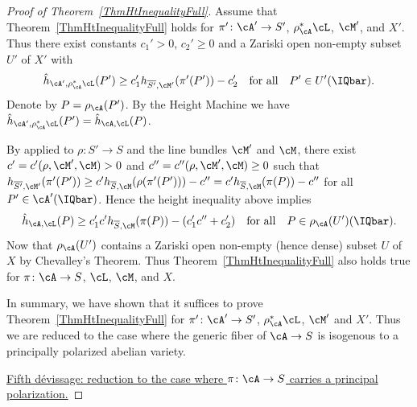 \begin{proof}[Proof of Theorem~\ref{ThmHtInequalityFull}]
Assume that Theorem~\ref{ThmHtInequalityFull} holds for $\pi' \colon \cA' \rightarrow S'$, $\rho_{\cA}^*\cL$, $\cM'$, and $X'$. Thus there exist constants $c_1'>0$, $c_2' \ge 0$ and a Zariski open non-empty subset $U'$ of $X'$ with
\[
\hat{h}_{\cA',\rho_{\cA}^*\cL}(P') \ge c_1' h_{\overline{S'},\cM'}(\pi'(P')) - c_2' \quad \text{for all} \quad P' \in U'(\IQbar).
\]
Denote by $P = \rho_{\cA}(P')$.
By the Height Machine we have $\hat{h}_{\cA',\rho_{\cA}^*\cL}(P') =
\hat{h}_{\cA,\cL}(P)$.%

By  \cite[Lemma~4]{Silverman:heightest11} applied to $\rho \colon S' \rightarrow S$ and the line bundles $\cM'$ and $\cM$, there exist $c' = c' (\rho,\cM',\cM) > 0$ and $c'' = c''(\rho,\cM',\cM) \ge 0$ such that $h_{\overline{S'},\cM'}(\pi'(P')) \ge c' h_{\overline{S},\cM}(\rho(\pi'(P'))) - c'' = c' h_{\overline{S},\cM}(\pi(P)) - c''$ for all $P' \in \cA'(\IQbar)$. Hence the height inequality above implies
\[
\hat{h}_{\cA,\cL}(P) \ge c_1'c' h_{\overline{S},\cM}(\pi(P)) - (c_1'c'' + c_2')\quad \text{for all}\quad P \in \rho_{\cA}(U')(\IQbar).
\]
Now that $\rho_{\cA}(U')$ contains a Zariski open non-empty (hence dense) subset $U$ of $X$ by Chevalley's Theorem.
Thus Theorem~\ref{ThmHtInequalityFull} also holds true for $\pi \colon \cA \rightarrow S$, $\cL$, $\cM$, and $X$.

In summary, we have shown that it suffices to prove Theorem~\ref{ThmHtInequalityFull} for $\pi' \colon \cA' \rightarrow S'$, $\rho_{\cA}^*\cL$, $\cM'$ and $X'$. Thus we are reduced to the case where the generic fiber of $\cA \rightarrow S$ is isogenous to a principally polarized abelian variety.%


\ul{Fifth d\'{e}vissage: reduction to the case where $\pi \colon \cA \rightarrow S$ carries a principal polarization.}


\end{proof}
